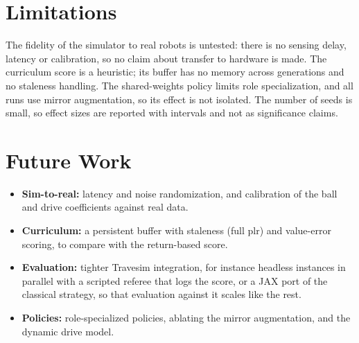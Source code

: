 \section{Limitations}
\label{sec:limitations}

The fidelity of the simulator to real robots is untested: there is no sensing delay, latency or calibration, so no claim about transfer to hardware is made.  The curriculum score is a heuristic; its buffer has no memory across generations and no staleness handling.
The shared-weights policy limits role specialization, and all runs use mirror augmentation, so its effect is not isolated.  The number of seeds is small, so effect sizes are reported with intervals and not as significance claims.

\section{Future Work}
\label{sec:future_work}

\begin{itemize}
  \item \textbf{Sim-to-real:} latency and noise randomization, and calibration of the ball and drive coefficients against real data.
  \item \textbf{Curriculum:} a persistent buffer with staleness (full \gls{plr}) and value-error scoring, to compare with the return-based score.
  \item \textbf{Evaluation:} tighter Travesim integration, for instance headless instances in parallel with a scripted referee that logs the score, or a JAX port of the classical strategy, so that evaluation against it scales like the rest.
  \item \textbf{Policies:} role-specialized policies, ablating the mirror augmentation, and the dynamic drive model.
\end{itemize}
